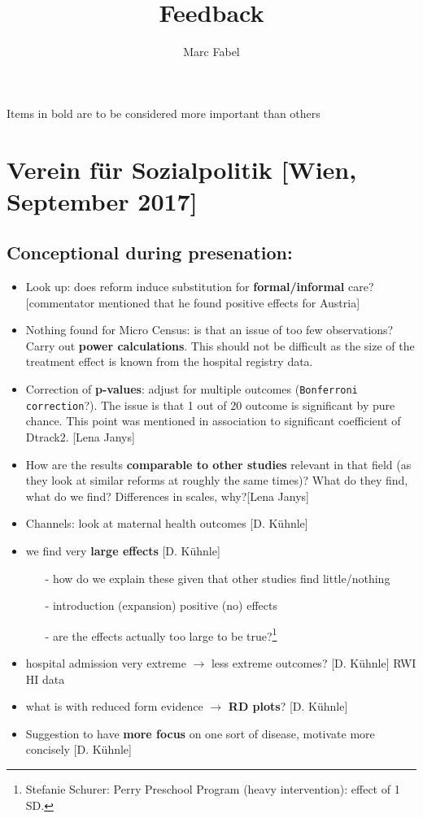 \documentclass[10pt,a4paper]{article}
\author{Marc Fabel}\date{\flushleft{Letzte Bearbeitung des Dokuments: \today}}
\title{Feedback}
\begin{document}
\maketitle

Items in bold are to be considered more important than others
\bigskip
\section{Verein für Sozialpolitik [Wien, September 2017]}
\subsection{Conceptional during presenation:}
\begin{itemize}
	\item Look up: does reform induce substitution for \textbf{formal/informal} care? [commentator mentioned that he found positive effects for Austria] 
	\item Nothing found for Micro Census: is that an issue of too few observations? Carry out \textbf{power calculations}. This should not be difficult as the size of the treatment effect is known from the hospital registry data.
	\item Correction of \textbf{p-values}: adjust for multiple outcomes (\texttt{Bonferroni correction}?). The issue is that 1 out of 20 outcome is significant by pure chance. This point was mentioned in association to significant coefficient of Dtrack2. [Lena Janys]
	\item How are the results \textbf{comparable to other studies} relevant in that field (as they look at similar reforms at roughly the same times)? What do they find, what do we find? Differences in scales, why?[Lena Janys]
	\item Channels: look at maternal health outcomes [D. Kühnle]
	\item we find very \textbf{large effects} [D. Kühnle]
\begin{itemize}
\item[-]how do we explain these given that other studies find little/nothing    
\item[-] introduction (expansion) positive (no) effects
\item[-] are the effects actually too large to be true?\footnote{Stefanie Schurer: Perry Preschool Program (heavy intervention): effect of 1 SD.}
\end{itemize}	
	\item hospital admission very extreme $\rightarrow$ less extreme outcomes? [D. Kühnle] RWI HI data
	\item what is with reduced form evidence $\rightarrow$ \textbf{RD plots}? [D. Kühnle]
	\item Suggestion to have \textbf{more focus} on one sort of disease, motivate more concisely [D. Kühnle]
\end{itemize}
\end{document}
